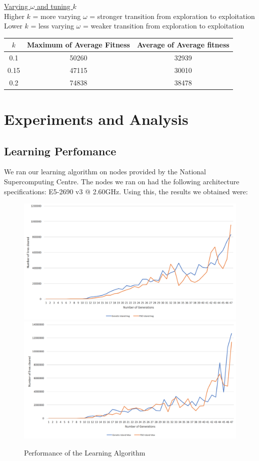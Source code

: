 \documentclass{article}
\begin{document}
	\underline{Varying $\omega$ and tuning $k$}\\
	Higher $k$ = more varying $\omega$ = stronger transition from exploration to exploitation\\
	Lower $k$ = less varying $\omega$ = weaker transition from exploration to exploitation\\

	\begin{tabular}{ | c | c | c | }
		\hline
		$k$ & Maximum of Average Fitness & Average of Average fitness \\ \hline
		0.1 & 50260 & 32939 \\ \hline
		0.15 & 47115 & 30010 \\ \hline
		0.2 & 74838 & 38478 \\ \hline
	\end{tabular}

    \section{Experiments and Analysis}

	\subsection{Learning Perfomance}
	We ran our learning algorithm on nodes provided by the National Supercomputing Centre.
	The nodes we ran on had the following architecture specifications: E5-2690 v3 @ 2.60GHz.
	Using this, the results we obtained were:

	\begin{figure}[h]
		\includegraphics[scale=0.28]{learning/AlgoMax}
		\includegraphics[scale=0.28]{learning/AlgoAvg}
		\centering
		\caption{Performance of the Learning Algorithm}
		\label{fig:learning}
	\end{figure}
\end{document}
